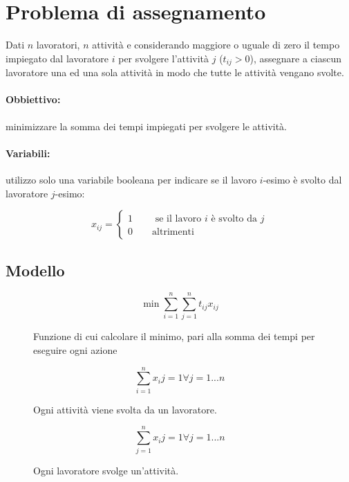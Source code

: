 \documentclass[\main/main.tex]{subfiles}
\begin{document}
\section{Problema di assegnamento}
Dati $n$ lavoratori, $n$ attività e considerando maggiore o uguale di zero il tempo impiegato dal lavoratore $i$ per svolgere l'attività $j$ ($t_{ij}>0$), assegnare a ciascun lavoratore una ed una sola attività in modo che tutte le attività vengano svolte.

\paragraph{Obbiettivo:} minimizzare la somma dei tempi impiegati per svolgere le attività.

\paragraph{Variabili:} utilizzo solo una variabile booleana per indicare se il lavoro $i$-esimo è svolto dal lavoratore $j$-esimo:

\[
	x_{ij} = \begin{cases}
		1 \qquad \text{ se il lavoro } i \text{ è svolto da } j\\
		0 \qquad \text{altrimenti}
	\end{cases}
\]

\subsection{Modello}

\begin{figure}[H]
\[
	\min \sum_{i=1}^n \sum_{j=1}^n t_{ij}x_{ij}
\]
\caption{Funzione di cui calcolare il minimo, pari alla somma dei tempi per eseguire ogni azione}
\end{figure}

\begin{figure}[H]
 \centering
 \begin{minipage}{0.5\textwidth}
 \centering
 \[
	\sum_{i=1}^n x_ij = 1 \forall j = 1...n 
 \]
\caption{Ogni attività viene svolta da un lavoratore.}
 \end{minipage}\hfill
 \begin{minipage}{0.5\textwidth}
 \[
	\sum_{j=1}^n x_ij = 1 \forall j = 1...n 
 \]
\caption{Ogni lavoratore svolge un'attività.}
 \end{minipage}\hfill
\end{figure}
\end{document}
